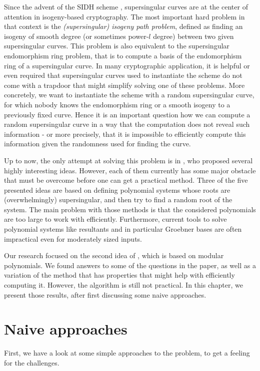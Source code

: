 
Since the advent of the SIDH scheme \cite{sidh}, supersingular curves are at the center of attention in isogeny-based cryptography.
The most important hard problem in that context is the \emph{(supersingular) isogeny path problem}, defined as finding an isogeny of smooth degree (or sometimes power-$l$ degree) between two given supersingular curves.
This problem is also equivalent \cite{endomorphism_ring_reductions} to the supersingular endomorphism ring problem, that is to compute a basis of the endomorphism ring of a supersingular curve.
In many cryptographic application, it is helpful or even required that supersingular curves used to instantiate the scheme do not come with a trapdoor that might simplify solving one of these problems.
More concretely, we want to instantiate the scheme with a random supersingular curve, for which nobody knows the endomorphism ring or a smooth isogeny to a previously fixed curve.
Hence it is an important question how we can compute a random supersingular curve in a way that the computation does not reveal such information - or more precisely, that it is impossible to efficiently compute this information given the randomness used for finding the curve. 

Up to now, the only attempt at solving this problem is in \cite{base_paper}, who proposed several highly interesting ideas.
However, each of them currently has some major obstacle that must be overcome before one can get a practical method.
Three of the five presented ideas are based on defining polynomial systems whose roots are (overwhelmingly) supersingular, and then try to find a random root of the system.
The main problem with those methods is that the considered polynomials are too large to work with efficiently.
Furthermore, current tools to solve polynomial systems like resultants and in particular Groebner bases are often impractical even for moderately sized inputs.

Our research focused on the second idea of \cite{base_paper}, which is based on modular polynomials.
We found answers to some of the questions in the paper, as well as a variation of the method that has properties that might help with efficiently computing it.
However, the algorithm is still not practical.
In this chapter, we present those results, after first discussing some naive approaches.

\section{Naive approaches}
First, we have a look at some simple approaches to the problem, to get a feeling for the challenges.

